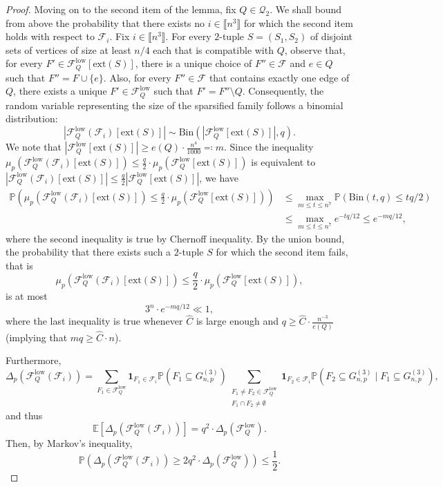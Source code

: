 \documentclass[11pt,a4paper,oneside,reqno]{amsart}
\newcommand{\Gnp}{G_{n, p}^{(3)}}
\newcommand{\cF}{\mathcal{F}}
\newcommand{\cQ}{\mathcal{Q}}
\renewcommand{\Pr}{\mathbb{P}}
\newcommand{\1}{\mathbbm{1}} %
\newcommand{\br}[1]{\llbracket{#1}\rrbracket}
\renewcommand{\le}{\leqslant}
\renewcommand{\ge}{\geqslant}
\newcommand{\cFQL}{\cF_Q^{\mathrm{low}}}
\newcommand{\ext}{\mathrm{ext}}
\begin{document}
\begin{proof}
    Moving on to the second item of the lemma, fix $Q \in \cQ_2$. We shall bound from above the probability that there exists no $i \in \br{n^3}$ for which the second item holds with respect to $\cF_i$. Fix $i \in \br{n^3}$. For every $2$-tuple $S = (S_1, S_2)$ of disjoint sets of vertices of size at least $n/4$ each that is compatible with $Q$, observe that, for every $F' \in \cFQL[\ext(S)]$, there is a unique choice of $F'' \in \cF$ and $e \in Q$ such that $F'' = F \cup \{e\}$. Also, for every $F'' \in \cF$ that contains exactly one edge of $Q$, there exists a unique $F' \in \cFQL$ such that $F' = F'' \setminus Q$. Consequently, the random variable representing the size of the sparsified family follows a binomial distribution:
    \[
        \left|\cFQL(\cF_i)[\ext(S)]\right| \sim \text{Bin}\left(\left|\cFQL[\ext(S)]\right|, q\right).
    \]
    We note that $\left|\cFQL[\ext(S)]\right| \ge e(Q) \cdot \frac{n^4}{1000} \eqqcolon m$. Since the inequality $\mu_p\left(\cFQL(\cF_i)[\ext(S)]\right) \le \frac{q}{2} \cdot \mu_p\left(\cFQL[\ext(S)]\right)$ is equivalent to $\left|\cFQL(\cF_i)[\ext(S)]\right| \le \frac{q}{2} \left| \cFQL[\ext(S)] \right|$, we have
    \begin{align*}
        \Pr\left(\mu_p\left(\cFQL(\cF_i)[\ext(S)]\right) \le \frac{q}{2} \cdot \mu_p\left(\cFQL[\ext(S)]\right)\right) &\le \max_{m \le t \le n^7}\Pr\left(\text{Bin}(t, q) \le tq / 2\right) \\&\le \max_{m \le t \le n^7} e^{-tq / 12} \le e^{-mq / 12},
    \end{align*}
    where the second inequality is true by Chernoff inequality. By the union bound, the probability that there exists such a $2$-tuple $S$ for which the second item fails, that is
    \[
        \mu_p\left(\cFQL(\cF_i)[\ext(S)]\right) \le \frac{q}{2} \cdot \mu_p\left(\cFQL[\ext(S)]\right),
    \]
    is at most
    \[
        3^n \cdot e^{-mq/12} \ll 1,
    \]
    where the last inequality is true whenever $\hat{C}$ is large enough and $q \ge \hat{C} \cdot \frac{n^{-3}}{e(Q)}$ (implying that $mq \ge \hat{C} \cdot n$).

    Furthermore, 
    \[
        \Delta_p\left(\cFQL(\cF_i)\right) = \sum_{F_1 \in \cFQL} \mathbf{1}_{F_1 \in \cF_i} \Pr\left(F_1 \subseteq \Gnp\right) \sum_{\substack{F_1 \neq F_2 \in \cFQL\\ F_1 \cap F_2 \neq \emptyset}} \mathbf{1}_{F_2 \in \cF_i} \Pr\left(F_2 \subseteq \Gnp \mid F_1 \subseteq \Gnp\right),
    \]
    and thus
    \[
        \mathbb{E}\left[\Delta_p\left(\cFQL(\cF_i)\right)\right] = q^2 \cdot \Delta_p\left(\cFQL\right).
    \]
    Then, by Markov's inequality, 
    \[
        \Pr\left(\Delta_p\left(\cFQL(\cF_i)\right) \ge 2 q^2 \cdot \Delta_p\left(\cFQL\right)\right) \le \frac{1}{2}.
    \]


\end{proof}
\end{document}
